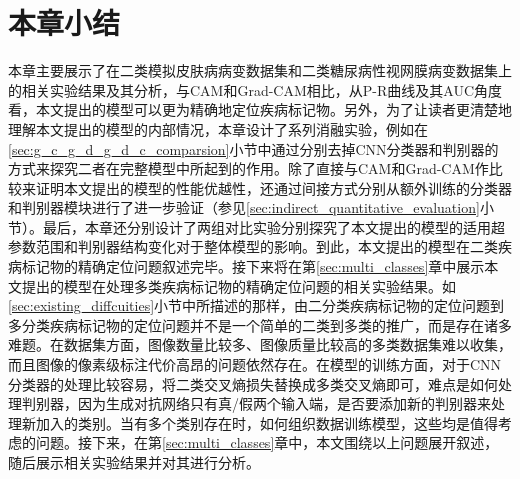 \section{本章小结}
本章主要展示了在二类模拟皮肤病病变数据集和二类糖尿病性视网膜病变数据集上的相关实验结果及其分析，与CAM和Grad-CAM相比，从P-R曲线及其AUC角度看，本文提出的模型可以更为精确地定位疾病标记物。另外，为了让读者更清楚地理解本文提出的模型的内部情况，本章设计了系列消融实验，例如在\ref{sec:g_c_g_d_g_d_c_comparsion}小节中通过分别去掉CNN分类器和判别器的方式来探究二者在完整模型中所起到的作用。除了直接与CAM和Grad-CAM作比较来证明本文提出的模型的性能优越性，还通过间接方式分别从额外训练的分类器和判别器模块进行了进一步验证（参见\ref{sec:indirect_quantitative_evaluation}小节）。最后，本章还分别设计了两组对比实验分别探究了本文提出的模型的适用超参数范围和判别器结构变化对于整体模型的影响。到此，本文提出的模型在二类疾病标记物的精确定位问题叙述完毕。接下来将在第\ref{sec:multi_classes}章中展示本文提出的模型在处理多类疾病标记物的精确定位问题的相关实验结果。如\ref{sec:existing_diffcuities}小节中所描述的那样，由二分类疾病标记物的定位问题到多分类疾病标记物的定位问题并不是一个简单的二类到多类的推广，而是存在诸多难题。在数据集方面，图像数量比较多、图像质量比较高的多类数据集难以收集，而且图像的像素级标注代价高昂的问题依然存在。在模型的训练方面，对于CNN分类器的处理比较容易，将二类交叉熵损失替换成多类交叉熵即可，难点是如何处理判别器，因为生成对抗网络只有真/假两个输入端，是否要添加新的判别器来处理新加入的类别。当有多个类别存在时，如何组织数据训练模型，这些均是值得考虑的问题。接下来，在第\ref{sec:multi_classes}章中，本文围绕以上问题展开叙述，随后展示相关实验结果并对其进行分析。



